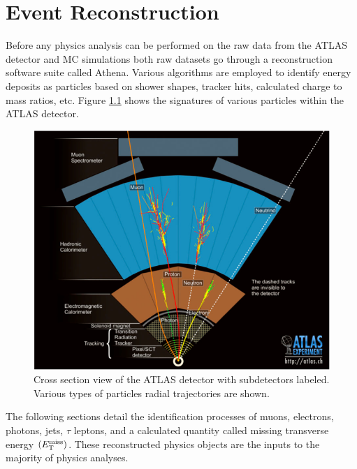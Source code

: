 \chapter{Event Reconstruction}\label{chap:reco}
	Before any physics analysis can be performed on the raw data from the ATLAS detector and MC simulations both raw datasets go through a reconstruction software suite called Athena. Various algorithms are employed to identify energy deposits as particles based on shower shapes, tracker hits, calculated charge to mass ratios, etc. Figure \ref{fig:ATLAS-XSec} shows the signatures of various particles within the ATLAS detector. 

	\begin{figure}[!ht]
	\centering
	\includegraphics[width=.65\textwidth,keepaspectratio=true]{chapters/chapter3_experiment/images/ATLASCrossSectionDiagram.png}
	\caption{ Cross section view of the ATLAS detector with subdetectors labeled. Various types of particles radial trajectories are shown.}
	\label{fig:ATLAS-XSec}
	\end{figure}

	The following sections detail the identification processes of muons, electrons, photons, jets, $\tau$ leptons, and a calculated quantity called missing transverse energy $(E_\text{T}^\text{miss})$. These reconstructed physics objects are the inputs to the majority of physics analyses.

